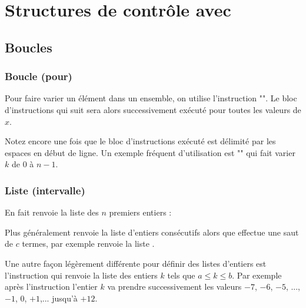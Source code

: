 \documentclass[class=report,crop=false]{standalone}
\begin{document}


\setcounter{section}{1}
\section{Structures de contrôle avec \Sage}

\subsection{Boucles}

\subsubsection*{Boucle  (pour)} 

Pour faire varier un élément dans un ensemble, on utilise
l'instruction "". Le bloc d'instructions qui suit sera 
alors successivement exécuté pour toutes les valeurs de $x$.


Notez encore une fois que le bloc d'instructions exécuté 
est délimité par les espaces en début de ligne.
Un exemple fréquent d'utilisation est "" qui fait varier $k$ de $0$ à $n-1$.


\subsubsection*{Liste  (intervalle)}


En fait  renvoie la liste des $n$ premiers entiers : \codeinline{[0,1,2,...,n-1]}

Plus généralement  renvoie la liste \codeinline{[a,a+1,...,b-1]} d'entiers consécutifs 
alors que   effectue une saut de $c$ termes,
par exemple  renvoie la liste \codeinline{[0,5,10,15,...,100]}.


Une autre façon légèrement différente pour définir des listes d'entiers 
est l'instruction \codeinline{[a..b]}
qui renvoie la liste des entiers $k$ tels que $a\le k \le b$.
Par exemple après l'instruction 
l'entier $k$ va prendre successivement les valeurs $-7$, $-6$, $-5$, ..., 
$-1$, $0$, $+1$,... jusqu'à $+12$.
\end{document}
